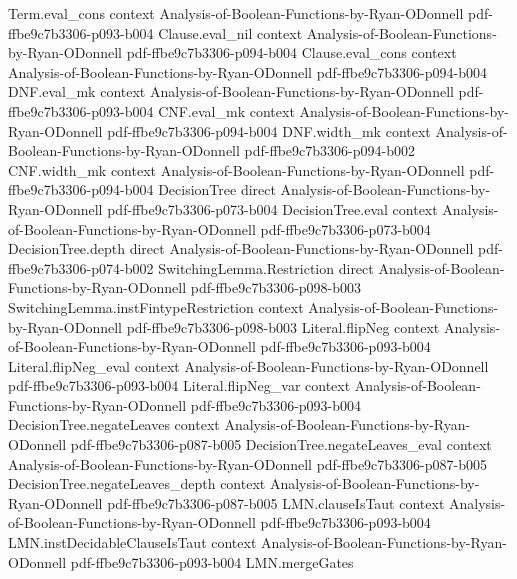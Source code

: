 \begin{lemma}
\proofstep
  {Term.eval_cons}
  {context}
  {Analysis-of-Boolean-Functions-by-Ryan-ODonnell}
  {pdf-ffbe9c7b3306-p093-b004}
\proofstep
  {Clause.eval_nil}
  {context}
  {Analysis-of-Boolean-Functions-by-Ryan-ODonnell}
  {pdf-ffbe9c7b3306-p094-b004}
\proofstep
  {Clause.eval_cons}
  {context}
  {Analysis-of-Boolean-Functions-by-Ryan-ODonnell}
  {pdf-ffbe9c7b3306-p094-b004}
\proofstep
  {DNF.eval_mk}
  {context}
  {Analysis-of-Boolean-Functions-by-Ryan-ODonnell}
  {pdf-ffbe9c7b3306-p093-b004}
\proofstep
  {CNF.eval_mk}
  {context}
  {Analysis-of-Boolean-Functions-by-Ryan-ODonnell}
  {pdf-ffbe9c7b3306-p094-b004}
\proofstep
  {DNF.width_mk}
  {context}
  {Analysis-of-Boolean-Functions-by-Ryan-ODonnell}
  {pdf-ffbe9c7b3306-p094-b002}
\proofstep
  {CNF.width_mk}
  {context}
  {Analysis-of-Boolean-Functions-by-Ryan-ODonnell}
  {pdf-ffbe9c7b3306-p094-b004}
\proofstep
  {DecisionTree}
  {direct}
  {Analysis-of-Boolean-Functions-by-Ryan-ODonnell}
  {pdf-ffbe9c7b3306-p073-b004}
\proofstep
  {DecisionTree.eval}
  {context}
  {Analysis-of-Boolean-Functions-by-Ryan-ODonnell}
  {pdf-ffbe9c7b3306-p073-b004}
\proofstep
  {DecisionTree.depth}
  {direct}
  {Analysis-of-Boolean-Functions-by-Ryan-ODonnell}
  {pdf-ffbe9c7b3306-p074-b002}
\proofstep
  {SwitchingLemma.Restriction}
  {direct}
  {Analysis-of-Boolean-Functions-by-Ryan-ODonnell}
  {pdf-ffbe9c7b3306-p098-b003}
\proofstep
  {SwitchingLemma.instFintypeRestriction}
  {context}
  {Analysis-of-Boolean-Functions-by-Ryan-ODonnell}
  {pdf-ffbe9c7b3306-p098-b003}
\proofstep
  {Literal.flipNeg}
  {context}
  {Analysis-of-Boolean-Functions-by-Ryan-ODonnell}
  {pdf-ffbe9c7b3306-p093-b004}
\proofstep
  {Literal.flipNeg_eval}
  {context}
  {Analysis-of-Boolean-Functions-by-Ryan-ODonnell}
  {pdf-ffbe9c7b3306-p093-b004}
\proofstep
  {Literal.flipNeg_var}
  {context}
  {Analysis-of-Boolean-Functions-by-Ryan-ODonnell}
  {pdf-ffbe9c7b3306-p093-b004}
\proofstep
  {DecisionTree.negateLeaves}
  {context}
  {Analysis-of-Boolean-Functions-by-Ryan-ODonnell}
  {pdf-ffbe9c7b3306-p087-b005}
\proofstep
  {DecisionTree.negateLeaves_eval}
  {context}
  {Analysis-of-Boolean-Functions-by-Ryan-ODonnell}
  {pdf-ffbe9c7b3306-p087-b005}
\proofstep
  {DecisionTree.negateLeaves_depth}
  {context}
  {Analysis-of-Boolean-Functions-by-Ryan-ODonnell}
  {pdf-ffbe9c7b3306-p087-b005}
\proofstep
  {LMN.clauseIsTaut}
  {context}
  {Analysis-of-Boolean-Functions-by-Ryan-ODonnell}
  {pdf-ffbe9c7b3306-p093-b004}
\proofstep
  {LMN.instDecidableClauseIsTaut}
  {context}
  {Analysis-of-Boolean-Functions-by-Ryan-ODonnell}
  {pdf-ffbe9c7b3306-p093-b004}
\proofstep
  {LMN.mergeGates}

\end{lemma}
